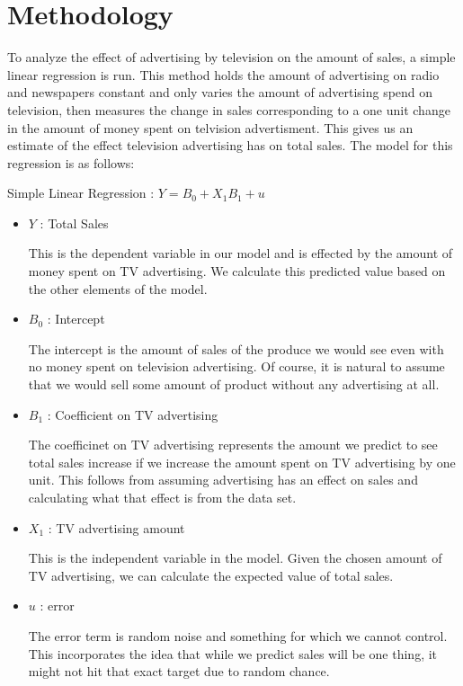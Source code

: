 \documentclass{article}\usepackage[]{graphicx}\usepackage[]{color}
\begin{document}
\section{Methodology}

To analyze the effect of advertising by television on the amount of sales, a simple linear regression is run. This method holds the amount of advertising on radio and newspapers constant and only varies the amount of advertising spend on television, then measures the change in sales corresponding to a one unit change in the amount of money spent on telvision advertisment. This gives us an estimate of the effect television advertising has on total sales. The model for this regression is as follows:

Simple Linear Regression : $Y = B_0 + X_1B_1 + u$

\begin{itemize}

\item $Y$ : Total Sales

This is the dependent variable in our model and is effected by the amount of money spent on TV advertising. We calculate this predicted value based on the other elements of the model.

\item $B_0$ : Intercept

The intercept is the amount of sales of the produce we would see even with no money spent on television advertising. Of course, it is natural to assume that we would sell some amount of product without any advertising at all.

\item $B_1$ : Coefficient on TV advertising

The coefficinet on TV advertising represents the amount we predict to see total sales increase if we increase the amount spent on TV advertising by one unit. This follows from assuming advertising has an effect on sales and calculating what that effect is from the data set. 

\item $X_1$ : TV advertising amount 

This is the independent variable in the model. Given the chosen amount of TV advertising, we can calculate the expected value of total sales. 

\item $u$ : error

The error term is random noise and something for which we cannot control. This incorporates the idea that while we predict sales will be one thing, it might not hit that exact target due to random chance. 
\end{itemize}
\end{document}
